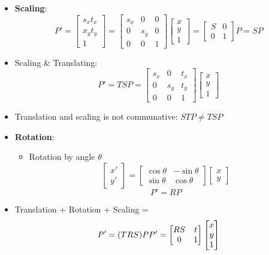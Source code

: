 \begin{itemize}
	\item \textbf{Scaling}:
	$$P'=\begin{bmatrix}
		s_x t_x\\x_y t_y\\1
	\end{bmatrix}=\begin{bmatrix}
		s_x & 0 & 0 \\
		0 & s_y & 0 \\
		0 & 0 & 1
	\end{bmatrix}\begin{bmatrix}
		x \\ y\\ 1
	\end{bmatrix}=\begin{bmatrix}
		S & 0 \\ 0 & 1
	\end{bmatrix}P=SP$$
	\item Scaling \& Translating:
	$$P'=TSP=\begin{bmatrix}
		s_x & 0 & t_x\\
		0 & s_y & t_y\\
		0 & 0 & 1
	\end{bmatrix}\begin{bmatrix}
		x \\ y \\ 1
	\end{bmatrix}$$
	\item Translation and scaling is not communative: $STP\neq TSP$
	\item \textbf{Rotation}:
	\begin{itemize}
		\item Rotation by angle $\theta$
		$$\begin{bmatrix}
			x' \\ y'
		\end{bmatrix}=\begin{bmatrix}
			\cos\theta & -\sin\theta \\
			\sin\theta & \cos\theta
		\end{bmatrix}\begin{bmatrix}
			x\\y
		\end{bmatrix}$$
		$$P'=RP$$
	\end{itemize}
	\item Translation + Rotation + Scaling = 
	$$P'=(TRS)P\\
	P'=\begin{bmatrix}
		RS & t \\ 0 & 1
	\end{bmatrix}\begin{bmatrix}
		x \\ y\\ 1
	\end{bmatrix}$$
\end{itemize}

